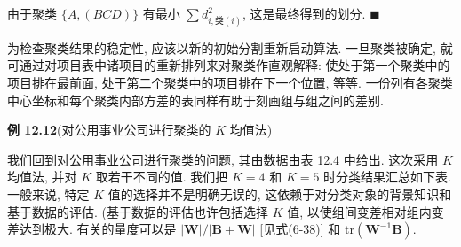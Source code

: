 由于聚类 $\{A,(BCD)\}$ 有最小 $\sum d^{2}_{i,\text{类}(i)}$, 这是最终得到的划分. \hfill$\blacksquare$

为检查聚类结果的稳定性, 应该以新的初始分割重新启动算法. 一旦聚类被确定, 就可通过对项目表中诸项目的重新排列来对聚类作直观解释:
使处于第一个聚类中的项目排在最前面, 处于第二个聚类中的项目排在下一个位置, 等等.
一份列有各聚类中心坐标和每个聚类内部方差的表同样有助于刻画组与组之间的差别.

\noindent\textbf{例 12.12}\quad (对公用事业公司进行聚类的 $K$ 均值法)

我们回到对公用事业公司进行聚类的问题, 其由数据由\hyperref[tab:12.4]{表 12.4} 中给出. 这次采用 $K$ 均值法, 并对 $K$ 取若干不同的值.
我们把 $K=4$ 和 $K=5$ 时分类结果汇总如下表. 一般来说, 特定 $K$ 值的选择并不是明确无误的, 这依赖于对分类对象的背景知识和基于数据的评估.
(基于数据的评估也许包括选择 $K$ 值, 以使组间变差相对组内变差达到极大. 有关的量度可以是 $|\mathbf{W}|/|\mathbf{B}+\mathbf{W}|$ [见\hyperref[eq:6-38]{式(6-38)}] 和 $\mathrm{tr}(\mathbf{W}^{-1}\mathbf{B})$.
